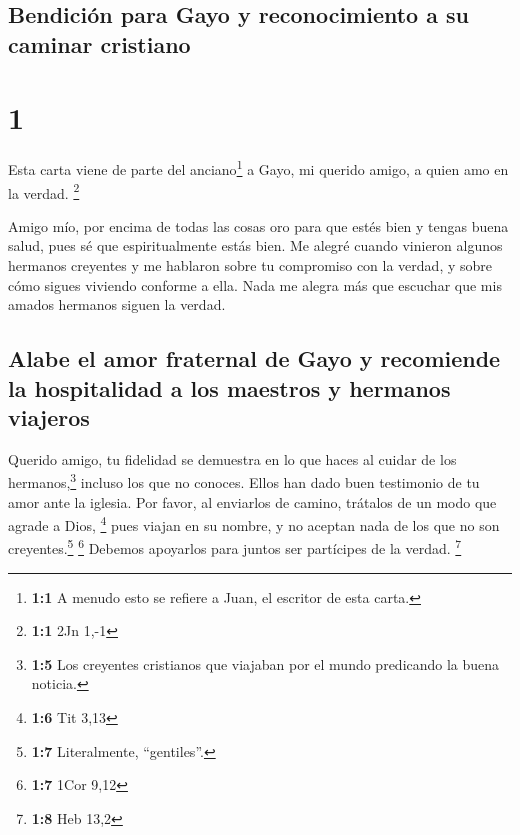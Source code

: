 \hypertarget{bendiciuxf3n-para-gayo-y-reconocimiento-a-su-caminar-cristiano}{%
\subsection{Bendición para Gayo y reconocimiento a su caminar
cristiano}\label{bendiciuxf3n-para-gayo-y-reconocimiento-a-su-caminar-cristiano}}

\hypertarget{section}{%
\section{1}\label{section}}

 Esta carta viene de parte del anciano\footnote{\textbf{1:1}
  A menudo esto se refiere a Juan, el escritor de esta carta.} a Gayo,
mi querido amigo, a quien amo en la verdad. \footnote{\textbf{1:1} 2Jn
  1,-1}

 Amigo mío, por encima de todas las cosas oro para que
estés bien y tengas buena salud, pues sé que espiritualmente estás bien.
 Me alegré cuando vinieron algunos hermanos creyentes y me
hablaron sobre tu compromiso con la verdad, y sobre cómo sigues viviendo
conforme a ella.  Nada me alegra más que escuchar que mis
amados hermanos siguen la verdad.

\hypertarget{alabe-el-amor-fraternal-de-gayo-y-recomiende-la-hospitalidad-a-los-maestros-y-hermanos-viajeros}{%
\subsection{Alabe el amor fraternal de Gayo y recomiende la hospitalidad
a los maestros y hermanos
viajeros}\label{alabe-el-amor-fraternal-de-gayo-y-recomiende-la-hospitalidad-a-los-maestros-y-hermanos-viajeros}}

 Querido amigo, tu fidelidad se demuestra en lo que haces
al cuidar de los hermanos,\footnote{\textbf{1:5} Los creyentes
  cristianos que viajaban por el mundo predicando la buena noticia.}
incluso los que no conoces.  Ellos han dado buen
testimonio de tu amor ante la iglesia. Por favor, al enviarlos de
camino, trátalos de un modo que agrade a Dios, \footnote{\textbf{1:6}
  Tit 3,13}  pues viajan en su nombre, y no aceptan nada
de los que no son creyentes.\footnote{\textbf{1:7} Literalmente,
  ``gentiles''.} \footnote{\textbf{1:7} 1Cor 9,12} 
Debemos apoyarlos para juntos ser partícipes de la verdad. \footnote{\textbf{1:8}
  Heb 13,2}

